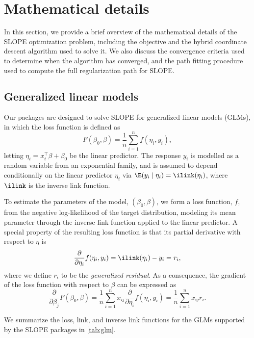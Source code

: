\documentclass[article]{jss}
\begin{document}
\section{Mathematical details}\label{sec:math-details}

In this section, we provide a brief overview of the mathematical
details of the SLOPE optimization problem, including the objective and
the hybrid coordinate descent algorithm used to solve it. We also discuss the
convergence criteria used to determine when the algorithm has converged, and
the path fitting procedure used to compute the full regularization path for SLOPE.

\subsection{Generalized linear models}

Our packages are designed to solve SLOPE for generalized linear models (GLMs),
in which the loss function is defined as
%
\[
  F(\beta_0, \beta) = \frac{1}{n} \sum_{i=1}^n f(\eta_i, y_i),
\]
%
letting \(\eta_i = x_i^\intercal \beta + \beta_0\) be the linear predictor. The
response \(y_i\) is modelled as a random variable from an exponential family,
and is assumed to depend conditionally on the linear predictor \(\eta_i\) via
\(\E(y_i \mid \eta_i) = \ilink(\eta_i)\), where \(\ilink\) is the inverse link
function.

To estimate the parameters of the model, \((\beta_0, \beta)\), we form a loss
function, \(f\), from the negative log-likelihood of the target distribution, modeling
its mean parameter through the inverse link function applied to the linear
predictor. A special property of the resulting loss function is that its
partial derivative with respect to \(\eta\) is
%
\[
  \frac{\partial}{\partial \eta_i} f(\eta_i, y_i) = \ilink(\eta_i) - y_i = r_i,
\]
%
where we define \(r_i\) to be the \emph{generalized residual}. As a
consequence, the gradient of the loss function with respect to \(\beta\) can be
expressed as
%
\[
  \frac{\partial}{\partial \beta_j} F(\beta_0,\beta)
  = \frac{1}{n} \sum_{i=1}^n x_{ij} \frac{\partial}{\partial \eta_i} f(\eta_i, y_i)
  = \frac{1}{n} \sum_{i=1}^n x_{ij} r_i.
\]

We summarize the loss, link, and inverse link functions for the GLMs supported
by the SLOPE packages in \autoref{tab:glm}.
\end{document}
